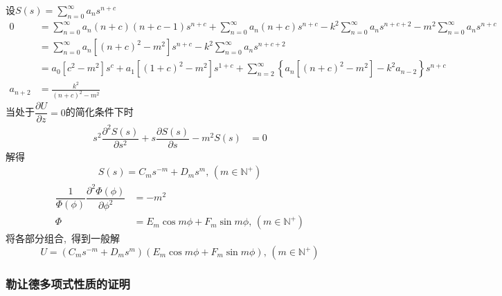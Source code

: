 设$S(s)=\sum\limits_{n=0}^{\infty}a_n s^{n+c}$
\begin{align*}
    0&=\sum\limits_{n=0}^{\infty}a_n(n+c)(n+c-1)s^{n+c}
    +\sum\limits_{n=0}^{\infty}a_n(n+c)s^{n+c}
    -k^2\sum\limits_{n=0}^{\infty}a_n s^{n+c+2}
    -m^2\sum\limits_{n=0}^{\infty}a_n s^{n+c}\\
    &=\sum\limits_{n=0}^{\infty}a_n\left[(n+c)^2-m^2\right]s^{n+c}
    -k^2\sum\limits_{n=0}^{\infty}a_n s^{n+c+2}\\
    &=a_0\left[c^2-m^2\right]s^{c}
    +a_1\left[(1+c)^2-m^2\right]s^{1+c}
    +\sum\limits_{n=2}^{\infty}\left\{a_n\left[(n+c)^2-m^2\right]-k^2 a_{n-2}\right\}s^{n+c}\\
    a_{n+2}&=\frac{k^2}{(n+c)^2-m^2}
\end{align*}
当处于$\dfrac{\partial U}{\partial z}=0$的简化条件下时
\begin{align}
    s^2\dfrac{{\partial^2 S(s)}}{\partial s^2}
    +s\dfrac{{\partial S(s)}}{\partial s}
    -m^2S(s)&=0
\end{align}
解得
\begin{align}
    S(s)=C_ms^{-m}+D_ms^{m},\,(m\in\mathbb N^+)
\end{align}
\begin{align}
    \dfrac{1}{\Phi(\phi)}\dfrac{{\partial^2 \Phi(\phi)}}{\partial \phi^2}&=-m^2\nonumber\\
    \Phi&=E_m\cos m\phi+F_m\sin m\phi,\,(m\in\mathbb N^+)
\end{align}
将各部分组合, \,得到一般解
\begin{equation}
    U=\left(C_ms^{-m}+D_ms^{m}\right)(E_m\cos m\phi+F_m\sin m\phi),\,(m\in\mathbb N^+)
\end{equation}
\subsubsection{勒让德多项式性质的证明}

